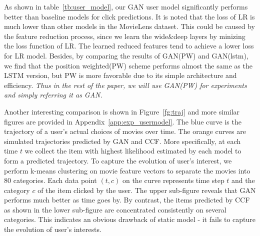 \documentclass{article} %
\begin{document}
As shown in table~\ref{tb:user_model}, our GAN user model significantly performs better than baseline models for click predictions. It is noted that the loss of LR is much lower than other models in the MovieLens dataset. This could be caused by the feature reduction process, since we learn the wide\&deep layers by minizing the loss function of LR. The learned reduced features tend to achieve a lower loss for LR model. Besides, by comparing the results of GAN(PW) and GAN(lstm), we find that the position weighted(PW) scheme performs almost the same as the LSTM version, but PW is more favorable due to its simple architecture and efficiency. \emph{Thus in the rest of the paper, we will use GAN(PW) for experiments and simply referring it as GAN.} 

Another interesting comparison is shown in Figure~\ref{fg:traj} and more similar figures are provided in Appendix~\ref{app:exp_usermodel}. The blue curve is the trajectory of a user's actual choices of movies over time. The orange curves are simulated trajectories predicted by GAN and CCF. More specifically, at each time $t$ we collect the item with highest likelihood estimated by each model to form a predicted trajectory. To capture the evolution of user's interest, we perform k-means clustering on movie feature vectors to separate the movies into 80 categories. Each data point $(t, c)$ on the curve represents time step $t$ and the category $c$ of the item clicked by the user.  The upper sub-figure reveals that GAN performs much better as time goes by. By contrast, the items predicted by CCF as shown in the lower sub-figure are concentrated consistently on several categories. This indicates an obvious drawback of static model - it fails to capture the evolution of user's interests. 
\end{document}

